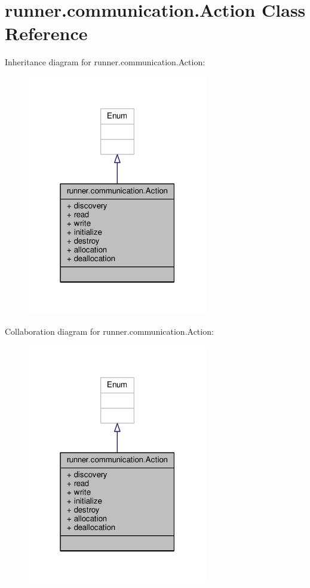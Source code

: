 \hypertarget{classrunner_1_1communication_1_1Action}{}\section{runner.\+communication.\+Action Class Reference}
\label{classrunner_1_1communication_1_1Action}


Inheritance diagram for runner.\+communication.\+Action\+:
\nopagebreak
\begin{figure}[H]
\begin{center}
\leavevmode
\includegraphics[width=223pt]{classrunner_1_1communication_1_1Action__inherit__graph}
\end{center}
\end{figure}


Collaboration diagram for runner.\+communication.\+Action\+:
\nopagebreak
\begin{figure}[H]
\begin{center}
\leavevmode
\includegraphics[width=223pt]{classrunner_1_1communication_1_1Action__coll__graph}
\end{center}
\end{figure}
